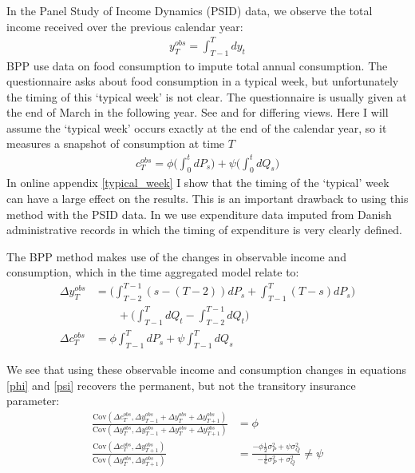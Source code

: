 \documentclass[AER]{AEA}
\begin{document}
In the Panel Study of Income Dynamics (PSID) data, we observe the total income received over the previous calendar year:
\begin{align*}
y^{obs}_T = \int_{T-1}^{T} dy_t
\end{align*}
BPP use data on food consumption to impute total annual consumption. The questionnaire asks about food consumption in a typical week, but unfortunately the timing of this `typical week' is not clear. The questionnaire is usually given at the end of March in the following year. See \cite{altonji_testing_1987} and \cite{hall_sensitivity_1982} for differing views. Here I will assume the `typical week' occurs exactly at the end of the calendar year, so it measures a snapshot of consumption at time $T$
\begin{align}
c^{obs}_T = \phi \Big( \int_{0}^{t} dP_s  \Big)  +\psi\Big( \int_{0}^{t}dQ_s\Big) \label{c_obs}
\end{align}
In online appendix \ref{typical_week} I show that the timing of the `typical' week can have a large effect on the results. This is an important drawback to using this method with the PSID data. In \cite{crawley_consumption_2018} we use expenditure data imputed from Danish administrative records in which the timing of expenditure is very clearly defined.

The BPP method makes use of the changes in observable income and consumption, which in the time aggregated model relate to:
\begin{align}
\Delta y^{obs}_T &=  \Big(\int_{T-2}^{T-1} (s-(T-2))dP_s  + \int_{T-1}^{T} (T-s)dP_s \Big) \nonumber \\
& \qquad + \Big(\int_{T-1}^{T} dQ_t -\int_{T-2}^{T-1} dQ_t \Big) \label{deltay} \\
\Delta c^{obs}_T &= \phi  \int_{T-1}^{T} dP_s  +\psi \int_{T-1}^{T}dQ_s  \label{deltac}
\end{align}

We see that using these observable income and consumption changes in equations \ref{phi} and \ref{psi} recovers the permanent, but not the transitory insurance parameter:
\begin{align}
\frac{\mathrm{Cov}(\Delta c^{obs}_{T}, \Delta y^{obs}_{T-1}+\Delta y^{obs}_{T}+\Delta y^{obs}_{T+1})}{\mathrm{Cov}(\Delta y^{obs}_{T}, \Delta y^{obs}_{T-1}+\Delta y^{obs}_{T}+\Delta y^{obs}_{T+1})}&= \phi\\
\frac{\mathrm{Cov}(\Delta c^{obs}_{T},\Delta y^{obs}_{T+1})}{\mathrm{Cov}(\Delta y^{obs}_{T},\Delta y^{obs}_{T+1})} &= \frac{-\phi\frac{1}{2}\sigma^2_P + \psi\sigma^2_Q}{-\frac{1}{6}\sigma^2_P + \sigma^2_Q} \neq \psi \label{not_psi}
\end{align}
\end{document}
